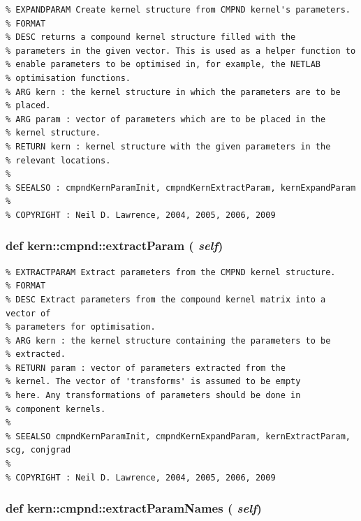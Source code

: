 \footnotesize\begin{verbatim}% EXPANDPARAM Create kernel structure from CMPND kernel's parameters.
% FORMAT
% DESC returns a compound kernel structure filled with the
% parameters in the given vector. This is used as a helper function to
% enable parameters to be optimised in, for example, the NETLAB
% optimisation functions.
% ARG kern : the kernel structure in which the parameters are to be
% placed.
% ARG param : vector of parameters which are to be placed in the
% kernel structure.
% RETURN kern : kernel structure with the given parameters in the
% relevant locations.
%
% SEEALSO : cmpndKernParamInit, cmpndKernExtractParam, kernExpandParam
%
% COPYRIGHT : Neil D. Lawrence, 2004, 2005, 2006, 2009

\end{verbatim}
\normalsize
 \hypertarget{classkern_1_1cmpnd_318f984498fc390d902dd5bc2358cf66}{
\subsubsection[{extractParam}]{\setlength{\rightskip}{0pt plus 5cm}def kern::cmpnd::extractParam ( {\em self})}}
\label{classkern_1_1cmpnd_318f984498fc390d902dd5bc2358cf66}




\footnotesize\begin{verbatim}% EXTRACTPARAM Extract parameters from the CMPND kernel structure.
% FORMAT
% DESC Extract parameters from the compound kernel matrix into a vector of
% parameters for optimisation.
% ARG kern : the kernel structure containing the parameters to be
% extracted.
% RETURN param : vector of parameters extracted from the
% kernel. The vector of 'transforms' is assumed to be empty
% here. Any transformations of parameters should be done in
% component kernels.
%
% SEEALSO cmpndKernParamInit, cmpndKernExpandParam, kernExtractParam, scg, conjgrad
%
% COPYRIGHT : Neil D. Lawrence, 2004, 2005, 2006, 2009

\end{verbatim}
\normalsize
 \hypertarget{classkern_1_1cmpnd_265822a277cefcadc62b50c5a4f2cc1a}{
\subsubsection[{extractParamNames}]{\setlength{\rightskip}{0pt plus 5cm}def kern::cmpnd::extractParamNames ( {\em self})}}
\label{classkern_1_1cmpnd_265822a277cefcadc62b50c5a4f2cc1a}





